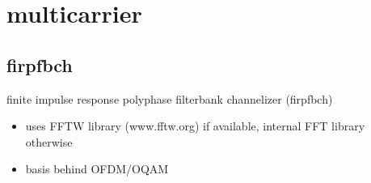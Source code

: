 %
%

\newpage
\section{multicarrier}

\subsection{firpfbch}
finite impulse response polyphase filterbank channelizer (firpfbch)
\begin{itemize}
\item uses FFTW library (www.fftw.org) if available, internal FFT library
      otherwise
\item basis behind OFDM/OQAM
\end{itemize}


